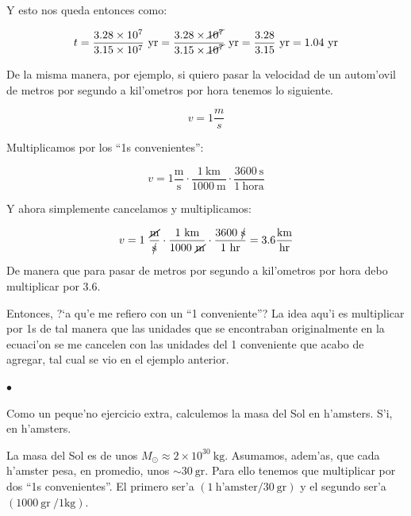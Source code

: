 \documentclass{article}
\begin{document}
Y esto nos queda entonces como:

\begin{equation*}
t = \frac{3.28 \times 10^7}{3.15 \times 10^7} \ \text{yr} = \frac{3.28 \times \cancel{10^7}}{3.15 \times \cancel{10^7}} \ \text{yr} = \frac{3.28}{3.15} \ \text{yr} = 1.04 \ \text{yr}
\end{equation*}

De la misma manera, por ejemplo, si quiero pasar la velocidad de un autom'ovil de metros por segundo a kil'ometros por hora tenemos lo siguiente. 

\begin{equation*}
v = 1 \frac{m}{s} 
\end{equation*}

Multiplicamos por los ``1s convenientes'':

\begin{equation*}
v = 1 \frac{\text{m}}{\text{s}} \cdot \frac{1 \ \text{km}}{1000 \ \text{m}} \cdot \frac{3600 \ \text{s}}{1 \ \text{hora}}   
\end{equation*}

Y ahora simplemente cancelamos y multiplicamos:

\begin{equation*}
v = 1 \ \frac{\cancel{\text{m}}}{\cancel{\text{{s}}}} \cdot \frac{1 \ \text{km}}{1000 \ \cancel{\text{m}}} \cdot \frac{3600 \ \cancel{\text{s}}}{1 \ \text{hr}} = 3.6 \frac{\text{km}}{\text{hr}}   
\end{equation*}

De manera que para pasar de metros por segundo a kil'ometros por hora debo multiplicar por $3.6$.

Entonces, ?`a qu'e me refiero con un ``1 conveniente''? La idea aqu'i es multiplicar por 1s de tal manera que las unidades que se encontraban originalmente en la ecuaci'on se me cancelen con las unidades del 1 conveniente que acabo de agregar, tal cual se vio en el ejemplo anterior.

\vspace{4mm}

\begin{small}
$\bullet$
\end{small}Como un peque'no ejercicio extra, calculemos la masa del Sol en h'amsters. S'i, en h'amsters. 

La masa del Sol es de unos $M_\odot \approx 2 \times 10^{30} \ \text{kg}$. Asumamos, adem'as, que cada h'amster pesa, en promedio, unos $\sim 30 \ \text{gr}$. Para ello tenemos que multiplicar por dos ``1s convenientes''. El primero ser'a $(1 \ \text{h'amster}/30 \ \text{gr})$ y el segundo ser'a $(1000 \ \text{gr}\ / 1 \text{kg})$. 
\end{document}
